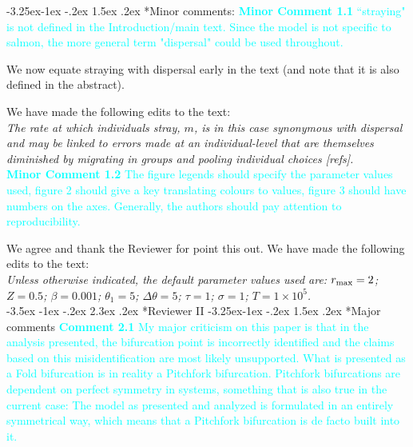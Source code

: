 \documentclass[ucm,12pt]{ucletter}
\makeatletter
\newcounter{section}
\newcounter{subsection}[section]
\renewcommand\section{\@startsection {section}{1}{\z@}%
                                   {-3.5ex \@plus -1ex \@minus -.2ex}%
                                   {2.3ex \@plus.2ex}%
                                   {\normalfont\Large\bfseries}}
\newcommand\subsection{\@startsection{subsection}{2}{\z@}%
                                     {-3.25ex\@plus -1ex \@minus -.2ex}%
                                     {1.5ex \@plus .2ex}%
                                     {\normalfont\large\bfseries}}
\makeatother
\begin{document}
\begin{letter}

\subsection*{Minor comments:}
\noindent \textcolor{cyan}{
{\bf Minor Comment 1.1} ``straying" is not defined in the Introduction/main text. Since the model is not specific to salmon, the more general term "dispersal" could be used throughout.}

 We now equate straying with dispersal early in the text (and note that it is also defined in the abstract).

\noindent We have made the following edits to the text:\\
 \emph{The rate at which individuals stray, $m$, is in this case synonymous with dispersal and may be linked to errors made at an individual-level that are themselves diminished by migrating in groups and pooling individual choices [refs].}\\

\noindent \textcolor{cyan}{
{\bf Minor Comment 1.2} The figure legends should specify the parameter values used, figure 2 should give a key translating colours to values, figure 3 should have numbers on the axes. Generally, the authors should pay attention to reproducibility.}

 We agree and thank the Reviewer for point this out. We have made the following edits to the text:\\
 \emph{Unless otherwise indicated, the default parameter values used are: $r_{\rm max}=2$; $Z=0.5$; $\beta=0.001$; $\theta_1=5$; $\Delta\theta=5$; $\tau=1$; $\sigma=1$; $T=1\times10^5$.}\\


\section*{Reviewer II}
\subsection*{Major comments}
\noindent \textcolor{cyan}{
{\bf Comment 2.1} My major criticism on this paper is that in the analysis presented, the bifurcation point is incorrectly identified and the claims based on this misidentification are most likely unsupported. What is presented as a Fold bifurcation is in reality a Pitchfork bifurcation. Pitchfork bifurcations are dependent on perfect symmetry in systems, something that is also true in the current case: The model as presented and analyzed is formulated in an entirely symmetrical way, which means that a Pitchfork bifurcation is de facto built into it.
}


\end{letter}
\end{document}
